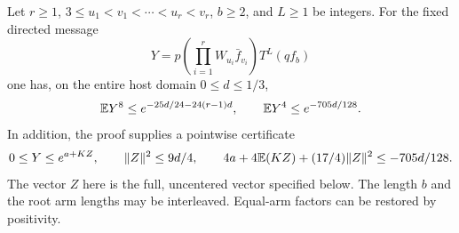 \begin{proposition}
\label{prop:root-post:square-moments}
Let \(r\ge1\), \(3\le u_1<v_1<\cdots<u_r<v_r\), \(b\ge2\), and
\(L\ge1\) be integers. For the fixed directed message
\begin{equation}\label{eq:root-post:scope}
 Y=p\left(\prod_{i=1}^rW_{u_i}\bar f_{v_i}\right)T^L(qf_b)
\end{equation}
one has, on the entire host domain \(0\le d\le1/3\),
\begin{equation}\label{eq:root-post:moments}
 \mathbb E Y^8\le e^{-25d/24-24(r-1)d},
 \qquad
 \mathbb E Y^4\le e^{-705d/128}.
\end{equation}
In addition, the proof supplies a pointwise certificate
\begin{equation}\label{eq:root-post:canonical-certificate}
 0\le Y\le e^{a+KZ},\qquad
 \|Z\|^2\le9d/4,\qquad
 4a+4\mathbb E(KZ)+(17/4)\|Z\|^2\le-705d/128.
\end{equation}
The vector \(Z\) here is the full, uncentered vector specified below.
The length $b$ and the root arm lengths may be interleaved.
Equal-arm factors can be restored by positivity.
\end{proposition}

